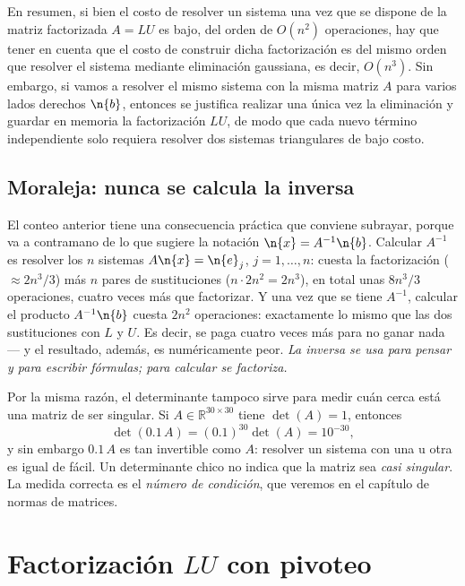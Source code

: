  En resumen, si bien el costo de resolver un sistema una vez que se dispone de la matriz factorizada $A=LU$ es bajo, del orden de $O(n^2)$ operaciones, hay que tener en cuenta que el costo de construir dicha factorización es del mismo orden que resolver el sistema mediante eliminación gaussiana, es decir, $O(n^3)$. Sin embargo, si vamos a resolver el mismo sistema con la misma matriz $A$ para varios lados derechos $\n{b}$, entonces se justifica realizar una única vez la eliminación y guardar en memoria la factorización $LU$, de modo que cada nuevo término independiente solo requiera resolver dos sistemas triangulares de bajo costo.



\subsection{Moraleja: nunca se calcula la inversa}

El conteo anterior tiene una consecuencia práctica que conviene subrayar,
porque va a contramano de lo que sugiere la notación $\n{x}=A^{-1}\n{b}$.
Calcular $A^{-1}$ es resolver los $n$ sistemas $A\n{x}=\n{e}_j$, $j=1,\dots,n$:
cuesta la factorización ($\approx 2n^3/3$) más $n$ pares de sustituciones
($n\cdot 2n^2 = 2n^3$), en total unas $8n^3/3$ operaciones, cuatro veces más que
factorizar. Y una vez que se tiene $A^{-1}$, calcular el producto $A^{-1}\n{b}$
cuesta $2n^2$ operaciones: exactamente lo mismo que las dos sustituciones con
$L$ y $U$. Es decir, se paga cuatro veces más para no ganar nada --- y el
resultado, además, es numéricamente peor. \emph{La inversa se usa para pensar y
para escribir fórmulas; para calcular se factoriza.}

\begin{remark}\label{obs:det-chico}
Por la misma razón, el determinante tampoco sirve para medir cuán cerca está una
matriz de ser singular. Si $A \in \mathbb{R}^{30\times 30}$ tiene $\det(A) = 1$,
entonces
\[
\det(0.1 \, A) = (0.1)^{30} \det(A) = 10^{-30},
\]
y sin embargo $0.1\,A$ es tan invertible como $A$: resolver un sistema con una u
otra es igual de fácil. Un determinante chico no indica que la matriz sea
\emph{casi singular}. La medida correcta es el \emph{número de condición}, que
veremos en el capítulo de normas de matrices.
\end{remark}

\section{Factorización $LU$ con pivoteo}\label{sec:pivoteo}

